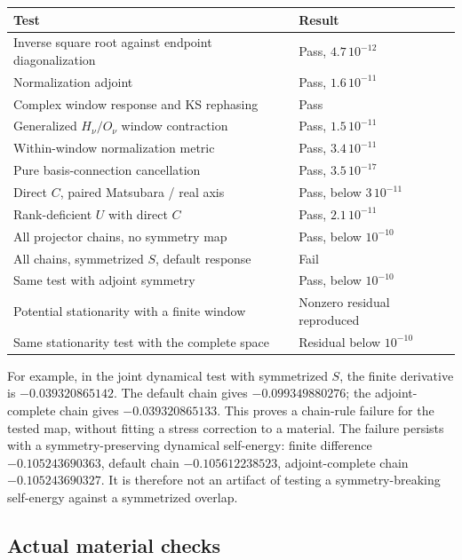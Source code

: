 \documentclass[11pt]{article}
\begin{document}
\begin{center}\small
\begin{tabular}{p{.60\linewidth}p{.30\linewidth}}\toprule
Test & Result\\\midrule
Inverse square root against endpoint diagonalization & Pass, $4.7\,10^{-12}$\\
Normalization adjoint & Pass, $1.6\,10^{-11}$\\
Complex window response and KS rephasing & Pass\\
Generalized $H_\nu/O_\nu$ window contraction & Pass, $1.5\,10^{-11}$\\
Within-window normalization metric & Pass, $3.4\,10^{-11}$\\
Pure basis-connection cancellation & Pass, $3.5\,10^{-17}$\\
Direct $C$, paired Matsubara / real axis & Pass, below $3\,10^{-11}$\\
Rank-deficient $U$ with direct $C$ & Pass, $2.1\,10^{-11}$\\
All projector chains, no symmetry map & Pass, below $10^{-10}$\\
All chains, symmetrized $S$, default response & Fail\\
Same test with adjoint symmetry & Pass, below $10^{-10}$\\
Potential stationarity with a finite window & Nonzero residual reproduced\\
Same stationarity test with the complete space & Residual below $10^{-10}$\\\bottomrule
\end{tabular}\end{center}

For example, in the joint dynamical test with symmetrized $S$, the finite
derivative is $-0.039320865142$. The default chain gives $-0.099349880276$;
the adjoint-complete chain gives $-0.039320865133$. This proves a chain-rule
failure for the tested map, without fitting a stress correction to a material.
The failure persists with a symmetry-preserving dynamical self-energy:
finite difference $-0.105243690363$, default chain $-0.105612238523$,
adjoint-complete chain $-0.105243690327$. It is therefore not an artifact
of testing a symmetry-breaking self-energy against a symmetrized overlap.

\subsection*{Actual material checks}

\end{document}
